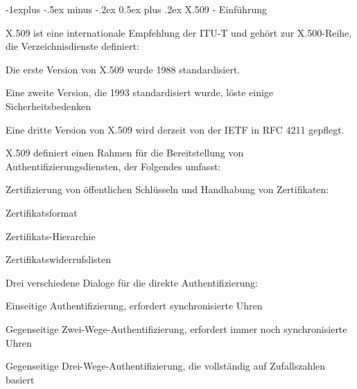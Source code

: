 \documentclass[a4paper]{article}
\makeatletter
\renewcommand{\subsection}{\@startsection{subsection}{2}{0mm}%
 {-1explus -.5ex minus -.2ex}%
 {0.5ex plus .2ex}%
 {\normalfont\normalsize\bfseries}}
\makeatother
\begin{document}
\begin{multicols}{3}
      \subsection{X.509 - Einführung}

      \begin{itemize*}
            \item
            X.509 ist eine internationale Empfehlung der ITU-T und gehört zur
            X.500-Reihe, die Verzeichnisdienste definiert:

            \begin{itemize*}
                  \item Die erste Version von X.509 wurde 1988 standardisiert.
                  \item Eine zweite Version, die 1993 standardisiert wurde, löste einige Sicherheitsbedenken
                  \item Eine dritte Version von X.509 wird derzeit von der IETF in RFC 4211 gepflegt.
            \end{itemize*}
            \item
            X.509 definiert einen Rahmen für die Bereitstellung von
            Authentifizierungsdiensten, der Folgendes umfasst:

            \begin{itemize*}
                  \item Zertifizierung von öffentlichen Schlüsseln und Handhabung von Zertifikaten:
                  \begin{itemize*} \item Zertifikatsformat \item Zertifikats-Hierarchie \item Zertifikatswiderrufslisten \end{itemize*}
                  \item Drei verschiedene Dialoge für die direkte Authentifizierung:
                  \begin{itemize*} \item Einseitige Authentifizierung, erfordert synchronisierte Uhren \item Gegenseitige Zwei-Wege-Authentifizierung, erfordert immer noch synchronisierte Uhren \item Gegenseitige Drei-Wege-Authentifizierung, die vollständig auf Zufallszahlen basiert \end{itemize*}
            \end{itemize*}
      \end{itemize*}



\end{multicols}
\end{document}
